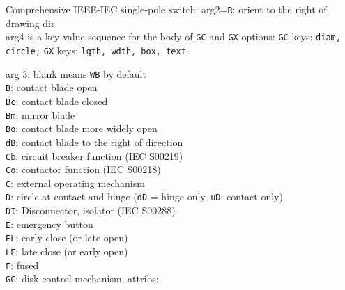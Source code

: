   {
                                 Comprehensive IEEE-IEC single-pole switch:
                                 arg2={\tt R}: orient to the right of
                                     drawing dir\\
                                 arg4 is a key-value sequence for the body of
                                 {\tt GC} and {\tt GX} options:
                                   {\tt GC} keys: {\tt diam, circle;}%
                                   {\tt GX} keys: {\tt lgth, wdth, box, text}.
\par
                                 arg 3:
                                   blank means {\tt WB} by default\\
                                   {\tt B}: contact blade open\\
                                   {\tt Bc}: contact blade closed\\
                                   {\tt Bm}: mirror blade\\
                                   {\tt Bo}: contact blade more widely open\\
                                   {\tt dB}: contact blade to the right of
                                     direction\\
                                   {\tt Cb}: circuit breaker function 
                                     (IEC S00219)\\
                                   {\tt Co}: contactor function (IEC S00218)\\
                                   {\tt C}: external operating mechanism\\
                                   {\tt D}: circle at contact and hinge
                                      ({\tt dD} = hinge only,
                                       {\tt uD}: contact only)\\
                                   {\tt DI}: Disconnector, isolator
                                     (IEC S00288)\\
                                   {\tt E}: emergency button\\
                                   {\tt EL}: early close (or late open)\\
                                   {\tt LE}: late close (or early open)\\
                                   {\tt F}: fused\\
                                   {\tt GC}: disk control mechanism, attribs:
}
